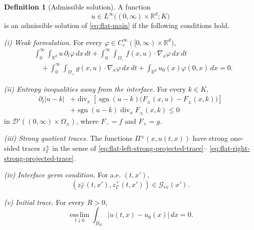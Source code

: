 \documentclass[11pt]{amsart}
\numberwithin{equation}{section}
\theoremstyle{plain}
\theoremstyle{definition}
\newtheorem{definition}[theorem]{Definition}
\theoremstyle{remark}
\begin{document}
\begin{definition}[Admissible solution]
\label{def:flat-admissible-solution}
A function
\[
    u\in L^\infty
    \bigl((0,\infty)\times\mathbb R^d;K\bigr)
\]
is an admissible solution of \eqref{eq:flat-main} if the following conditions
hold.

\smallskip
\noindent
\emph{(i) Weak formulation.}
For every
\(\varphi\in C_c^\infty([0,\infty)\times\mathbb R^d)\),
\begin{align}
\label{eq:flat-weak-formulation}
&\int_0^\infty\int_{\mathbb R^d}
    u\,\partial_t\varphi\,dx\,dt
+
\int_0^\infty\int_{\Omega_-}
    f(x,u)\cdot\nabla_x\varphi\,dx\,dt
\nonumber\\
&\quad+
\int_0^\infty\int_{\Omega_+}
    g(x,u)\cdot\nabla_x\varphi\,dx\,dt
+
\int_{\mathbb R^d}u_0(x)\varphi(0,x)\,dx
=0.
\end{align}

\smallskip
\noindent
\emph{(ii) Entropy inequalities away from the interface.}
For every \(k\in K\),
\begin{equation}
\label{eq:flat-entropy-solution}
\begin{aligned}
    \partial_t|u-k|
    &+
    \operatorname{div}_x
    \left[
        \operatorname{sgn}(u-k)
        \bigl(F_\pm(x,u)-F_\pm(x,k)\bigr)
    \right]
\\
    &+
    \operatorname{sgn}(u-k)
    \operatorname{div}_xF_\pm(x,k)
    \leq0
\end{aligned}
\end{equation}
in \(\mathcal D'((0,\infty)\times\Omega_\pm)\), where
\(F_-=f\) and \(F_+=g\).

\smallskip
\noindent
\emph{(iii) Strong quotient traces.}
The functions \(\Pi^\pm(x,u(t,x))\) have strong one-sided traces
\(z^\pm_\Gamma\) in the sense of
\eqref{eq:flat-left-strong-projected-trace}--%
\eqref{eq:flat-right-strong-projected-trace}.

\smallskip
\noindent
\emph{(iv) Interface germ condition.}
For a.e. \((t,x')\),
\begin{equation}
\label{eq:flat-solution-germ}
    (z^-_\Gamma(t,x'),z^+_\Gamma(t,x'))
    \in
    \mathcal G_{\mathrm{vv}}(x').
\end{equation}

\smallskip
\noindent
\emph{(v) Initial trace.}
For every \(R>0\),
\begin{equation}
\label{eq:flat-initial-trace}
    \operatorname*{ess\,lim}_{t\downarrow0}
    \int_{B_R}|u(t,x)-u_0(x)|\,dx
    =0.
\end{equation}
\end{definition}
\end{document}
